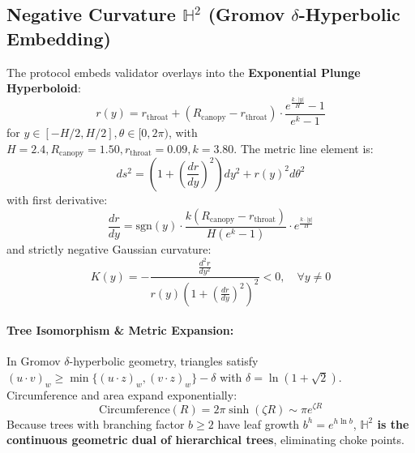 \documentclass[10pt,twocolumn,letterpaper]{article}
\begin{document}
\subsection{Negative Curvature $\mathbb{H}^2$ (Gromov $\delta$-Hyperbolic Embedding)}
The protocol embeds validator overlays into the \textbf{Exponential Plunge Hyperboloid}:
\begin{equation}
r(y) = r_{\text{throat}} + (R_{\text{canopy}} - r_{\text{throat}}) \cdot \frac{e^{\frac{k \cdot |y|}{H}} - 1}{e^k - 1}
\end{equation}
for $y \in [-H/2, H/2], \theta \in [0, 2\pi)$, with $H = 2.4, R_{\text{canopy}} = 1.50, r_{\text{throat}} = 0.09, k = 3.80$. The metric line element is:
\begin{equation}
ds^2 = \left(1 + \left(\frac{dr}{dy}\right)^2\right) dy^2 + r(y)^2 d\theta^2
\end{equation}
with first derivative:
\begin{equation}
\frac{dr}{dy} = \text{sgn}(y) \cdot \frac{k(R_{\text{canopy}} - r_{\text{throat}})}{H(e^k - 1)} \cdot e^{\frac{k \cdot |y|}{H}}
\end{equation}
and strictly negative Gaussian curvature:
\begin{equation}
K(y) = -\frac{\frac{d^2 r}{dy^2}}{r(y)\left(1 + \left(\frac{dr}{dy}\right)^2\right)^2} < 0, \quad \forall y \ne 0
\end{equation}

\paragraph{Tree Isomorphism \& Metric Expansion:} In Gromov $\delta$-hyperbolic geometry, triangles satisfy $(u \cdot v)_w \ge \min\{(u \cdot z)_w, (v \cdot z)_w\} - \delta$ with $\delta = \ln(1 + \sqrt{2})$. Circumference and area expand exponentially:
\begin{equation}
\text{Circumference}(R) = 2\pi \sinh(\zeta R) \sim \pi e^{\zeta R}
\end{equation}
Because trees with branching factor $b \ge 2$ have leaf growth $b^h = e^{h \ln b}$, \textbf{$\mathbb{H}^2$ is the continuous geometric dual of hierarchical trees}, eliminating choke points.
\end{document}
